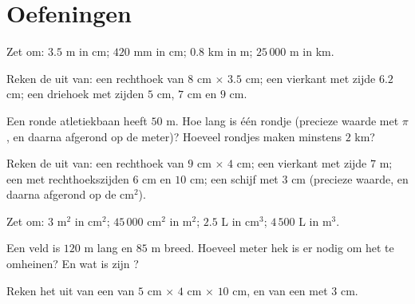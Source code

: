 \section{Oefeningen}

\begin{exercise}[$\star$]\label{exo:g6:measure:1}
Zet om: $3.5$ m in cm; $420$ mm in cm; $0.8$ km in m; $25\,000$ m in km.
\end{exercise}

\begin{exercise}[$\star$]\label{exo:g6:measure:2}
Reken de  uit van: een rechthoek van $8$ cm $\times$ $3.5$ cm; een
vierkant met zijde $6.2$ cm; een driehoek met zijden $5$ cm, $7$ cm en $9$ cm.
\end{exercise}

\begin{exercise}[$\star$]\label{exo:g6:measure:3}
Een ronde atletiekbaan heeft  $50$ m. Hoe lang is één rondje (precieze
waarde met $\pi$, en daarna afgerond op de meter)? Hoeveel rondjes maken minstens
$2$ km?
\end{exercise}

\begin{exercise}[$\star$]\label{exo:g6:measure:4}
Reken de  uit van: een rechthoek van $9$ cm $\times$ $4$ cm; een
vierkant met zijde $7$ m; een  met rechthoekszijden $6$ cm
en $10$ cm; een schijf met  $3$ cm (precieze waarde, en daarna afgerond op
de cm$^2$).
\end{exercise}

\begin{exercise}[$\star$]\label{exo:g6:measure:5}
Zet om: $3$ m$^2$ in cm$^2$; $45\,000$ cm$^2$ in m$^2$; $2.5$ L in cm$^3$;
$4\,500$ L in m$^3$.
\end{exercise}

\begin{exercise}[$\star$]\label{exo:g6:measure:6}
Een  veld is $120$ m lang en $85$ m breed. Hoeveel meter hek is er
nodig om het te omheinen? En wat is zijn ?
\end{exercise}

\begin{exercise}[$\star$]\label{exo:g6:measure:7}
Reken het  uit van een  van $5$ cm $\times$ $4$ cm $\times$ $10$ cm,
en van een  met  $3$ cm.
\end{exercise}

